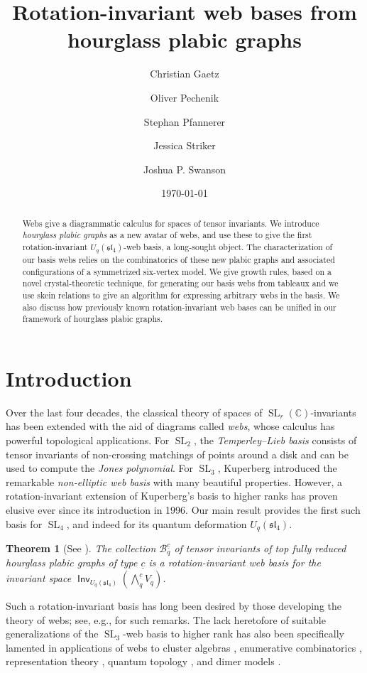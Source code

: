 \documentclass{amsart}
\title{Rotation-invariant web bases from hourglass plabic graphs}
\author[Gaetz]{Christian Gaetz}
\author[Pechenik]{Oliver Pechenik}
\author[Pfannerer]{Stephan Pfannerer}
\author[Striker]{Jessica Striker}
\author[Swanson]{Joshua P. Swanson}
\date{\today}
\newtheorem{introthm}{Theorem}
\theoremstyle{definition}
\theoremstyle{remark}
\numberwithin{equation}{section}
\DeclareMathOperator{\SL}{SL}
\newcommand{\fsl}{\mathfrak{sl}}
\DeclareMathOperator{\Inv}{\mathsf{Inv}}
\begin{document}
\begin{abstract}
Webs give a diagrammatic calculus for spaces of tensor invariants. We introduce \emph{hourglass plabic graphs} as a new avatar of webs, and use these to give the first rotation-invariant $U_q(\fsl_4)$-web basis, a long-sought object. The characterization of our basis webs relies on the combinatorics of these new plabic graphs and associated configurations of a symmetrized six-vertex model. We give growth rules, based on a novel crystal-theoretic technique, for generating our basis webs from tableaux and we use skein relations to give an algorithm for expressing arbitrary webs in the basis. We also discuss how previously known rotation-invariant web bases can be unified in our framework of hourglass plabic graphs.
\end{abstract}

\maketitle
\setcounter{tocdepth}{1}
\tableofcontents
\section{Introduction}

Over the last four decades, the classical theory of spaces of  $\SL_r(\mathbb{C})$-invariants has been extended with the aid of diagrams called \emph{webs}, whose calculus has powerful topological applications. For $\SL_2$, the \emph{Temperley--Lieb basis} consists of tensor invariants of non-crossing matchings of points around a disk and can be used to compute the \emph{Jones polynomial}. For $\SL_3$, Kuperberg \cite{Kuperberg} introduced the remarkable \emph{non-elliptic web basis} with many beautiful properties. However, a rotation-invariant extension of Kuperberg's basis to higher ranks has proven elusive ever since its introduction in 1996. Our main result provides the first such basis for $\SL_4$, and indeed for its quantum deformation $U_q(\fsl_4)$.

\begin{introthm}[See ]\label{thm:A}
The collection $\mathscr{B}_q^{\underline{c}}$ of tensor invariants of top fully reduced hourglass plabic graphs of type $\underline{c}$ is a rotation-invariant web basis for the invariant space $\Inv_{U_q(\fsl_4)}(\bigwedge\nolimits_q^{\underline{c}} V_q)$.
\end{introthm}
Such a rotation-invariant basis has long been desired by those developing the theory of webs; see, e.g., \cite{Westbury, Fontaine, Fraser-Lam-Le,Fraser:braid, Fraser-2-column} for such remarks. The lack heretofore of suitable generalizations of the $\SL_3$-web basis to higher rank has also been specifically lamented in applications of webs to cluster algebras \cite{Fomin-Pylyavskyy-advances}, enumerative combinatorics \cite{Petersen-Pylyavskyy-Rhoades}, representation theory \cite{Tymoczko-Russell-unitriangular}, quantum topology \cite[p.~10]{Le.Sikora}, and dimer models \cite{Douglas-Kenyon-Shi}.
\end{document}
